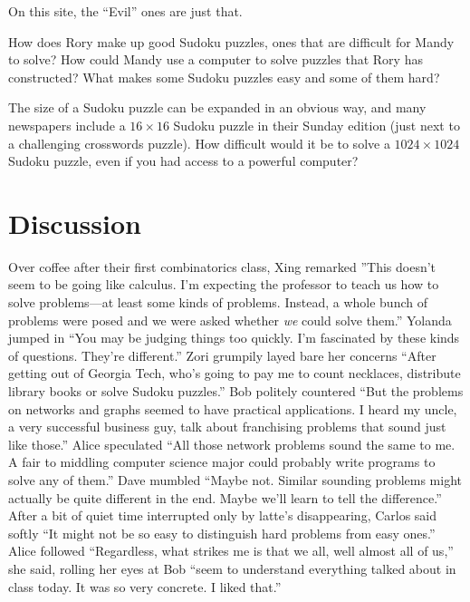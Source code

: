 \begin{example}
\medskip
\noindent
On this site, the ``Evil'' ones are just that.

How does Rory make up good Sudoku puzzles, ones that are difficult
for Mandy to solve?  How could Mandy use
a computer to solve puzzles that Rory has constructed? 
What makes some Sudoku puzzles easy and some of them hard?

The size of a Sudoku puzzle can be expanded in an obvious
way, and many newspapers include a $16\times16$ Sudoku puzzle
in their Sunday edition (just next to a challenging crosswords puzzle).
How difficult would it be to solve a $1024\times1024$ Sudoku puzzle,
even if you had access to a powerful computer?
\end{example}

\section{Discussion}\label{s:intro:discussion}

Over coffee after their first combinatorics class, Xing remarked
''This doesn't seem to be going like calculus.  I'm expecting
the professor to teach us how to solve problems---at least some
kinds of problems.  Instead, a whole bunch
of problems were posed and we were asked whether 
\textit{we} could solve them.'' Yolanda jumped in ``You may be 
judging things too quickly.  I'm fascinated by these kinds
of questions.  They're different.''  Zori grumpily layed
bare her concerns
``After getting out of Georgia Tech, who's going to pay me to
count necklaces, distribute library books or solve Sudoku puzzles.''
Bob politely countered ``But the problems on networks and graphs
seemed to have practical applications.  I heard my uncle, a very
successful business guy, talk about franchising problems that
sound just like those.''  Alice speculated ``All those network problems
sound the same to me.  A fair to middling computer science major could 
probably write programs to solve any of them.''  Dave mumbled ``Maybe not.
Similar sounding problems might actually be quite different in the end.  
Maybe we'll learn to tell the difference.'' 
After a bit of quiet time interrupted only by latte's disappearing,
Carlos said softly ``It might not be so easy to distinguish hard 
problems from easy ones.'' Alice followed ``Regardless, what strikes 
me is that we all,  well almost all of us,''
she said, rolling her eyes at Bob ``seem to understand everything talked 
about in class today.  It was so very concrete. I liked that.''

